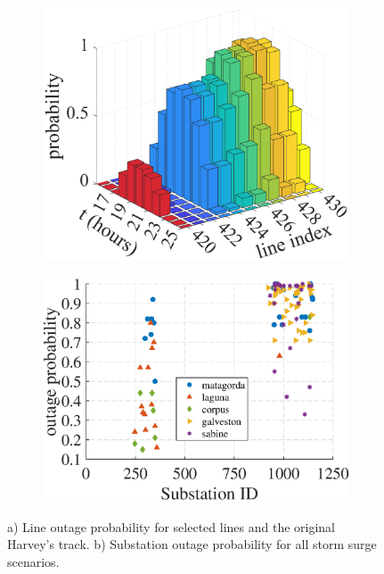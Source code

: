 \begin{figure}[!h!]
    \centering
    \begin{subfigure}[t]{0.47\textwidth}
        \centering
        \includegraphics[width=\linewidth]{figures/outage_probability_line_.eps}
        \caption{}
        \label{fig:line_outage_probability}    
    \end{subfigure}
    \hspace*{\fill}
    \begin{subfigure}[t]{0.47\textwidth}
        \centering
        \includegraphics[width=\linewidth]{figures/outage_probability_substation_.eps}
        \caption{}
        \label{fig:substation_outage_probability}
    \end{subfigure}
    \caption{a) Line outage probability for selected lines and the original Harvey's track. b) Substation outage probability for all storm surge scenarios.} 
    \vspace{-10pt}
    \label{fig:hurricane_flood_outages}
\end{figure}

